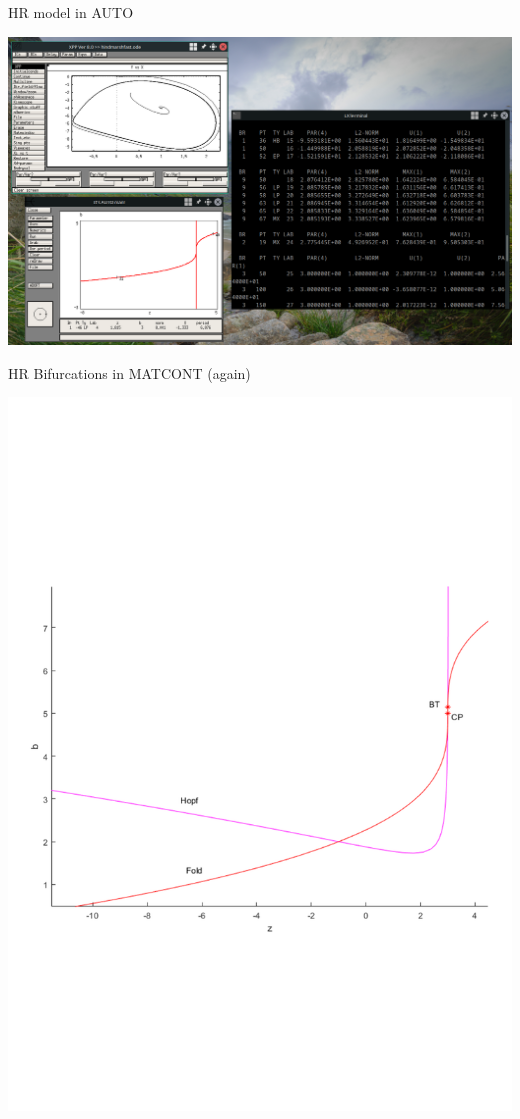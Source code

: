 \documentclass{beamer}
\begin{document}
\begin{frame}[label={sec:org2a6a545}]{HR model in AUTO}
\begin{center}
\includegraphics[height=.9\textheight]{auto3.png}
\end{center}
\end{frame}

\begin{frame}[label={sec:org218fa87}]{HR Bifurcations in MATCONT (again)}
\begin{center}
\includegraphics[trim={1cm 7cm 1cm 8cm}, clip,height=.9\textheight]{HRzbBif.pdf}
\end{center}
\end{frame}
\end{document}
